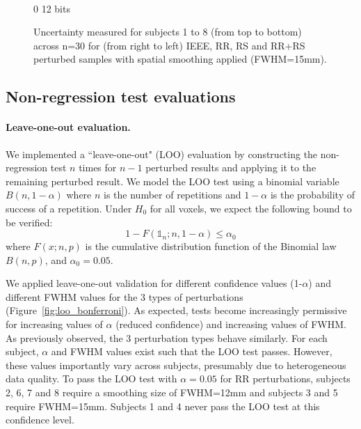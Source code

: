 \documentclass{article}
\begin{document}
\begin{landscape}
\begin{figure}
\begin{subfigure}[t]{0.2\paperheight}
        \end{subfigure} \\
        \hspace*{6cm} 0  12 bits
        \caption{Uncertainty measured for subjects 1 to 8 (from top to bottom) across n=30 for
            (from right to left) IEEE, RR, RS and RR+RS perturbed samples with spatial smoothing applied (FWHM=15mm). }
        \label{fig:uncertainty-maps}

    \end{figure}
\end{landscape}

\subsection{Non-regression test evaluations}

\paragraph{Leave-one-out evaluation.} We implemented a ``leave-one-out" (LOO) evaluation by constructing the non-regression test $n$ times for $n-1$ perturbed results and applying it to the remaining perturbed result. We model the LOO test using a binomial variable $B(n,1-\alpha)$ where $n$ is the number of repetitions and $1-\alpha$ is the probability of success of a repetition. Under $H_0$ for all voxels, we expect the following bound to be verified:
\[
    1-F(\mathds{1}_n;n,1-\alpha) \leq \alpha_0
\]
where $F(x;n,p)$ is the cumulative distribution function of the Binomial law $B(n,p)$, and $\alpha_0=0.05$.

We applied leave-one-out validation for different confidence values (1-$\alpha$) and different FWHM  values for the 3 types of perturbations (Figure~\ref{fig:loo_bonferroni}). As expected, tests become increasingly permissive for increasing values of $\alpha$ (reduced confidence) and increasing values of FWHM. As previously observed, the 3 perturbation types behave similarly. For each subject, $\alpha$ and FWHM values exist such that the LOO test passes. However, these values importantly vary across subjects, presumably due to heterogeneous data quality. To pass the LOO test with $\alpha=0.05$ for RR perturbations, subjects 2, 6, 7 and 8 require a smoothing size of FWHM=12mm and subjects 3 and 5 require FWHM=15mm. Subjects 1 and 4 never pass the LOO test at this confidence level.
\end{document}
